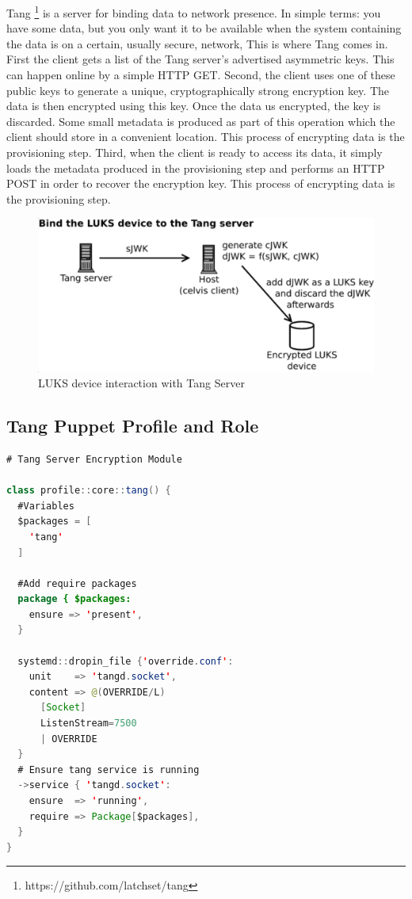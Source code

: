 Tang \footnote[3]{https://github.com/latchset/tang} is a server for binding data to network presence. In simple terms: you have some data, but you only want it to be available when the system containing the data is on a certain, usually secure, network, This is where Tang comes in.
First the client gets a list of the Tang server's advertised asymmetric keys. This can happen online by a simple HTTP GET. 
Second, the client uses one of these public keys to generate a unique, cryptographically strong encryption key. The data is then encrypted using this key. Once the data us encrypted, the key is discarded. Some small metadata is produced as part of this operation which the client should store in a convenient location. This process of encrypting data is the provisioning step.
Third, when the client is ready to access its data, it simply loads the metadata produced in the provisioning step and performs an HTTP POST in order to recover the encryption key. This process of encrypting data is the provisioning step.

\vskip 2cm
\begin{figure}
  \includegraphics[width=14cm]{images/image3.png}
  \centering
  \caption{LUKS device interaction with Tang Server}
\end{figure}

\newpage
\subsection{Tang Puppet Profile and Role}

\begin{lstlisting}[language=Java]
# Tang Server Encryption Module

class profile::core::tang() {
  #Variables
  $packages = [
    'tang'
  ]

  #Add require packages
  package { $packages:
    ensure => 'present',
  }

  systemd::dropin_file {'override.conf':
    unit    => 'tangd.socket',
    content => @(OVERRIDE/L)
      [Socket]
      ListenStream=7500
      | OVERRIDE
  }
  # Ensure tang service is running
  ->service { 'tangd.socket':
    ensure  => 'running',
    require => Package[$packages],
  }
}
\end{lstlisting}

